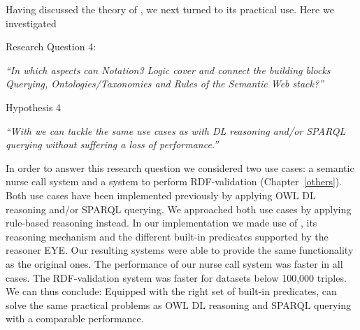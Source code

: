 
Having discussed the theory of \nthree, we next turned to its practical use. Here we investigated 

Research Question 4:

\emph{ 
``In which aspects can Notation3 Logic cover and connect the building blocks \emph{Querying}, \emph{Ontologies/Taxonomies} and \emph{Rules} 
of the Semantic Web stack?''
}


Hypothesis 4

\emph{
``With \nthreelogic %
we can tackle the same use cases as with \owl DL reasoning and/or SPARQL querying without suffering a loss of performance.''
}


In order to answer this research question we considered two use cases: a semantic nurse call 
system and a system to perform RDF-validation (Chapter~\ref{others}). Both use cases have been implemented previously by applying OWL DL reasoning and/or SPARQL querying.
We approached both use cases by applying rule-based reasoning instead. In our implementation we made use of \nthree, its reasoning mechanism and the different built-in 
predicates supported by the reasoner EYE. 
Our resulting systems were able to provide the same functionality as the original ones.
The performance of our nurse call system was faster in all cases.  
The RDF-validation system was faster for datasets below 100,000 triples. 
We can thus conclude: Equipped with the right set of built-in predicates, \nthree can solve the same practical problems as OWL DL reasoning and SPARQL querying with a comparable performance.

